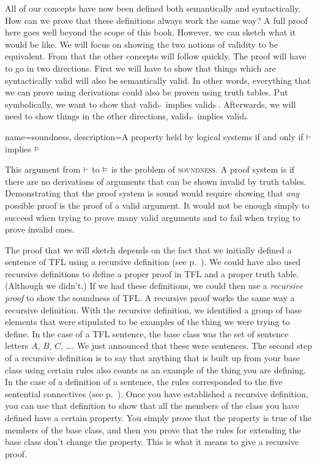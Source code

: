 All of our concepts have now been defined both semantically and syntactically. How can we prove that these definitions always work the same way? A full proof here goes well beyond the scope of this book. However, we can sketch what it would be like. We will focus on showing the two notions of validity to be equivalent.  From that the other concepts will follow quickly. The proof will have to go in two directions. First we will have to show that things which are syntactically valid will also be semantically valid. In other words, everything that we can prove using derivations could also be proven using truth tables. Put symbolically, we want to show that valid$_{\vdash}$ implies valid$_{\vDash}$. Afterwards, we will need to show things in the other directions,  valid$_{\vDash}$ implies valid$_{\vdash}$

{
name=soundness,
description={A property held by logical systems if and only if $\vdash $ implies $\vDash $}
}

This argument from $\vdash $ to $\vDash $ is the problem of \textsc{\gls{soundness}}. \label{def:soundness} A proof system is  if there are no derivations of arguments that can be shown invalid by truth tables. \label{def_Soundness} Demonstrating that the proof system is sound would require showing that \emph{any} possible proof is the proof of a valid argument. It would not be enough simply to succeed when trying to prove many valid arguments and to fail when trying to prove invalid ones.

The proof that we will sketch depends on the fact that we initially defined a sentence of TFL using a recursive definition (see p.~\pageref{TFLsentences}). We could have also used recursive definitions to define a proper proof in TFL and a proper truth table. (Although we didn't.) If we had these definitions, we could then use a \emph{recursive proof} to show the soundness of TFL. A recursive proof works the same way a recursive definition. With the recursive definition, we identified a group of base elements that were stipulated to be examples of the thing we were trying to define. In the case of a TFL sentence, the base class was the set of sentence letters $A$, $B$, $C$, \dots. We just announced that these were sentences. The second step of a recursive definition is to say that anything that is built up from your base class using certain rules also counts as an example of the thing you are defining. In the case of a definition of a sentence, the rules corresponded to the five sentential connectives (see p.~\pageref{TFLsentences}). Once you have established a recursive definition, you can use that definition to show that all the members of the class you have defined have a certain property. You simply prove that the property is true of the members of the base class, and then you prove that the rules for extending the base class don't change the property. This is what it means to give a recursive proof.

